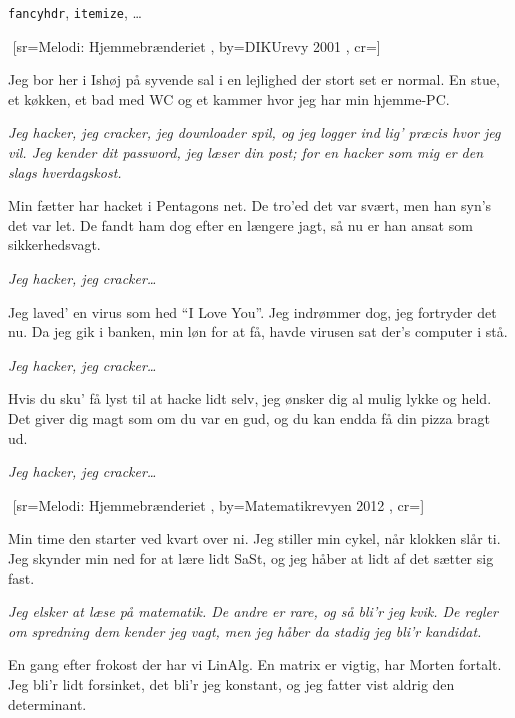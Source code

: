 \documentclass[pdftex,12pt]{article}
\begin{document}
\begin{songs}{}
\beginverse
\texttt{fancyhdr}, \texttt{itemize}, \ldots
\endverse
\endsong



﻿%
[sr={Melodi: Hjemmebrænderiet}
,
by={DIKUrevy 2001}
,
cr={}]\hypertarget{Hjemmehackeriet}{}
\label{song53}

\beginverse
Jeg bor her i Ishøj på syvende sal
i en lejlighed der stort set er normal.
En stue, et køkken, et bad med WC
og et kammer hvor jeg har min hjemme-PC.

\endverse
\beginverse
\emph{Jeg hacker, jeg cracker, jeg downloader spil,
og jeg logger ind lig' præcis hvor jeg vil.
Jeg kender dit password, jeg læser din post;
for en hacker som mig er den slags hverdagskost.}

\endverse
\beginverse
Min fætter har hacket i Pentagons net.
De tro'ed det var svært, men han syn's det var let.
De fandt ham dog efter en længere jagt,
så nu er han ansat som sikkerhedsvagt.

\endverse
\beginverse
\emph{Jeg hacker, jeg cracker\ldots}

\endverse
\beginverse
Jeg laved' en virus som hed ``I Love You''.
Jeg indrømmer dog, jeg fortryder det nu.
Da jeg gik i banken, min løn for at få,
havde virusen sat der's computer i stå.

\endverse
\beginverse
\emph{Jeg hacker, jeg cracker\ldots}

\endverse
\beginverse
Hvis du sku' få lyst til at hacke lidt selv,
jeg ønsker dig al mulig lykke og held.
Det giver dig magt som om du var en gud,
og du kan endda få din pizza bragt ud.

\endverse
\beginverse
\emph{Jeg hacker, jeg cracker\ldots}

\endverse
\endsong



﻿%
[sr={Melodi: Hjemmebrænderiet}
,
by={Matematikrevyen 2012}
,
cr={}]\hypertarget{Studiedag}{}
\label{song54}

\beginverse
Min time den starter ved kvart over ni.
Jeg stiller min cykel, når klokken slår ti.
Jeg skynder min ned for at lære lidt SaSt,
og jeg håber at lidt af det sætter sig fast.
\endverse

\beginverse
\emph{Jeg elsker at læse på matematik.
De andre er rare, og så bli'r jeg kvik.
De regler om spredning dem kender jeg vagt,
men jeg håber da stadig jeg bli'r kandidat.}
\endverse

\beginverse
En gang efter frokost der har vi LinAlg.
En matrix er vigtig, har Morten fortalt.
Jeg bli'r lidt forsinket, det bli'r jeg konstant,
og jeg fatter vist aldrig den determinant.
\endverse


\end{songs}
\end{document}
